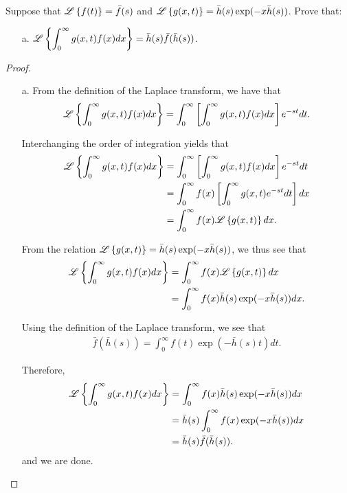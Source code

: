 \begin{problem}{3.24}
  Suppose that $\mathscr{L}\left\{ {f(t)} \right\} = \bar{f}(s)$ and $\mathscr{L}\left\{ {g(x, t)} \right\} = \bar{h}(s)\exp(-x\bar{h}(s))$. Prove that:
  \begin{enumerate}
    \item[a.] $\displaystyle \mathscr{L}\left\{ {\int_0^\infty g(x, t)f(x) dx} \right\} = \bar{h}(s)\bar{f}(\bar{h}(s))$.
  \end{enumerate}
\end{problem}

\begin{proof}
  \begin{enumerate}
    \item[a.] From the definition of the Laplace transform, we have that
      \begin{align*}
        \mathscr{L}\left\{ {\int_0^\infty g(x,t) f(x) dx} \right\} = \int_0^\infty\left[\int_0^\infty g(x,t) f(x) dx\right]e^{-st}dt.
      \end{align*}

      Interchanging the order of integration yields that
      \begin{align*}
        \mathscr{L}\left\{ {\int_0^\infty g(x,t) f(x) dx} \right\} &= \int_0^\infty\left[\int_0^\infty g(x,t) f(x) dx\right]e^{-st}dt \\
        &= \int_0^\infty f(x) \left[\int_0^\infty g(x,t) e^{-st}dt\right]dx \\
        &= \int_0^\infty f(x) \mathscr{L}\left\{ {g(x, t)} \right\}dx.
      \end{align*}

      From the relation $\mathscr{L}\left\{ {g(x, t)} \right\} = \bar{h}(s)\exp(-x\bar{h}(s))$, we thus see that
      \begin{align*}
        \mathscr{L}\left\{ {\int_0^\infty g(x,t) f(x) dx} \right\} &= \int_0^\infty f(x) \mathscr{L}\left\{ {g(x, t)} \right\}dx \\
        &= \int_0^\infty f(x) \bar{h}(s) \exp(-x\bar{h}(s))dx.
      \end{align*}

      Using the definition of the Laplace transform, we see that
      \begin{align*}
        \bar{f}(\bar{h}(s)) = \int_0^\infty f(t) \exp(-\bar{h}(s)t) dt.
      \end{align*}

      Therefore,
      \begin{align*}
        \mathscr{L}\left\{ {\int_0^\infty g(x,t) f(x) dx} \right\}
        &= \int_0^\infty f(x) \bar{h}(s) \exp(-x\bar{h}(s))dx \\
        &= \bar{h}(s)\int_0^\infty f(x) \exp(-x\bar{h}(s))dx \\
        &= \bar{h}(s) \bar{f}(\bar{h}(s)).
      \end{align*}
      and we are done.
  \end{enumerate}
\end{proof}
\newpage
